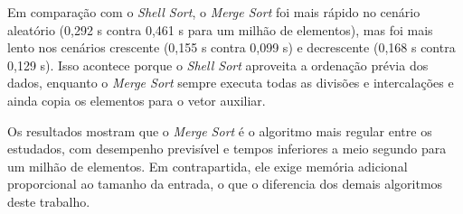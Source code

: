 \qquad Em comparação com o \textit{Shell Sort}, o \textit{Merge Sort} foi mais rápido no cenário aleatório (0,292 s contra 0,461 s para um milhão de elementos), mas foi mais lento nos cenários crescente (0,155 s contra 0,099 s) e decrescente (0,168 s contra 0,129 s). Isso acontece porque o \textit{Shell Sort} aproveita a ordenação prévia dos dados, enquanto o \textit{Merge Sort} sempre executa todas as divisões e intercalações e ainda copia os elementos para o vetor auxiliar.

\qquad Os resultados mostram que o \textit{Merge Sort} é o algoritmo mais regular entre os estudados, com desempenho previsível e tempos inferiores a meio segundo para um milhão de elementos. Em contrapartida, ele exige memória adicional proporcional ao tamanho da entrada, o que o diferencia dos demais algoritmos deste trabalho.

\FloatBarrier
